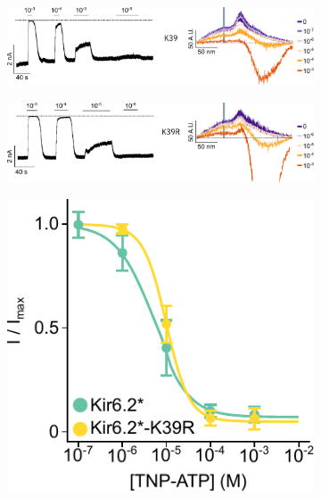 \begin{figure}[h]
	\centering
	\begin{subfigure}[t]{0.45\textwidth}
		\caption{}\label{ch5fig:k39_traces_1}
		\centering
		\includegraphics[width=\textwidth]{k39_traces_1.pdf}
	\end{subfigure}
	\hfill
	\begin{subfigure}[t]{0.45\textwidth}
		\caption{}\label{ch5fig:k39_traces_2}
		\centering
		\includegraphics[width=\textwidth]{k39_traces_2.pdf}
	\end{subfigure}
	\vfill
	\begin{subfigure}[t]{0.45\textwidth}
		\caption{}\label{ch5fig:k39_drc_1}
		\centering
		\includegraphics[width=\textwidth]{k39_drc_1.pdf}

\end{subfigure}
\end{figure}
